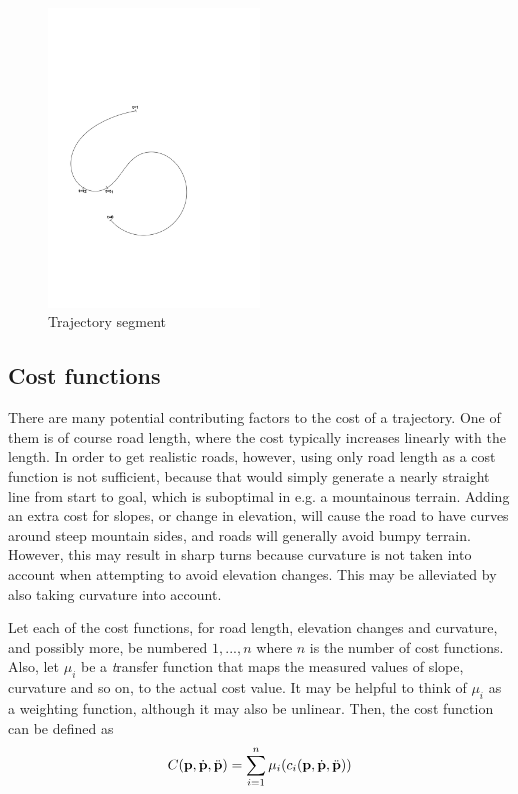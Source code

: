 \begin{figure}[ht]
\centering
\includegraphics[width=0.5\textwidth]{figure/trajectory_segment}
\caption{Trajectory segment}
\label{fig:trajectory_segment}
\end{figure}

\subsection{Cost functions}
There are many potential contributing factors to the cost of a trajectory. One of them is of course road length, where the cost typically increases linearly with the length. In order to get realistic roads, however, using only road length as a cost function is not sufficient, because that would simply generate a nearly straight line from start to goal, which is suboptimal in e.g. a mountainous terrain. Adding an extra cost for slopes, or change in elevation, will cause the road to have curves around steep mountain sides, and roads will generally avoid bumpy terrain. However, this may result in sharp turns because curvature is not taken into account when attempting to avoid elevation changes. This may be alleviated by also taking curvature into account.

Let each of the cost functions, for road length, elevation changes and curvature, and possibly more, be numbered $1, ..., n$ where $n$ is the number of cost functions. Also, let $\mu_i$ be a {\textit transfer function} that maps the measured values of slope, curvature and so on, to the actual cost value. It may be helpful to think of $\mu_i$ as a weighting function, although it may also be unlinear. Then, the cost function can be defined as
$$
C({\mathbf p}, \dot{{\mathbf p}}, \ddot{\mathbf{p}}) = \sum_{i=1}^{n} \mu_i(c_i({\mathbf p}, \dot{{\mathbf p}}, \ddot{\mathbf{p}}))
$$

